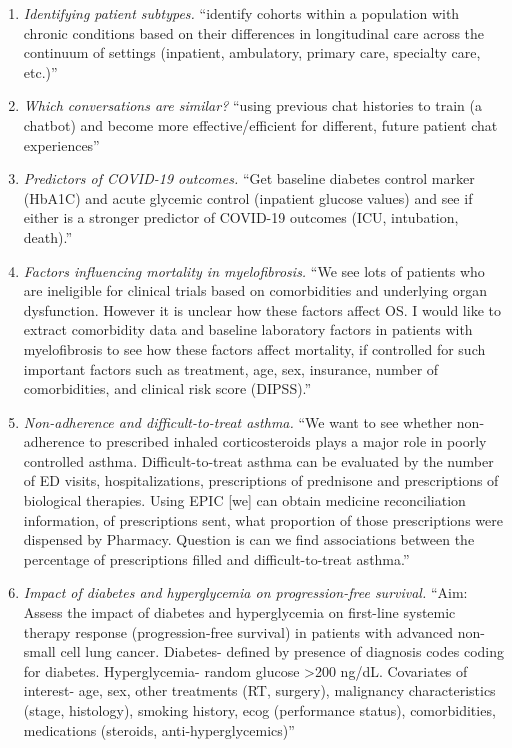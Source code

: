 \begin{enumerate}
\item \textit{Identifying patient subtypes.} ``identify cohorts within a population with chronic conditions based on their differences in longitudinal care across the continuum of settings (inpatient, ambulatory, primary care, specialty care, etc.)''
\item \textit{Which conversations are similar?} ``using previous chat histories to train (a chatbot) and become more effective/efficient for different, future patient chat experiences''
\item \textit{Predictors of COVID-19 outcomes.} ``Get baseline diabetes control marker (HbA1C) and acute glycemic control (inpatient glucose values) and see if either is a stronger predictor of COVID-19 outcomes (ICU, intubation, death).''
\item \textit{Factors influencing mortality in myelofibrosis.} ``We see lots of patients who are ineligible for clinical trials based on comorbidities and underlying organ dysfunction. However it is unclear how these factors affect OS. I would like to extract comorbidity data and baseline laboratory factors in patients with myelofibrosis to see how these factors affect mortality, if controlled for such important factors such as treatment, age, sex, insurance, number of comorbidities, and clinical risk score (DIPSS).''
\item \textit{Non-adherence and difficult-to-treat asthma.} ``We want to see whether non-adherence to prescribed inhaled corticosteroids plays a major role in poorly controlled asthma. Difficult-to-treat asthma can be evaluated by the number of ED visits, hospitalizations, prescriptions of prednisone and prescriptions of biological therapies. Using EPIC [we] can obtain medicine reconciliation information, of prescriptions sent, what proportion of those prescriptions were dispensed by Pharmacy. Question is can we find associations between the percentage of prescriptions filled and difficult-to-treat asthma.''
\item \textit{Impact of diabetes and hyperglycemia on progression-free survival.} ``Aim: Assess the impact of diabetes and hyperglycemia on first-line systemic therapy response (progression-free survival) in patients with advanced non-small cell lung cancer. Diabetes- defined by presence of diagnosis codes coding for diabetes. Hyperglycemia- random glucose >200 ng/dL. Covariates of interest- age, sex, other treatments (RT, surgery), malignancy characteristics (stage, histology), smoking history, ecog (performance status), comorbidities, medications (steroids, anti-hyperglycemics)''

\end{enumerate}
